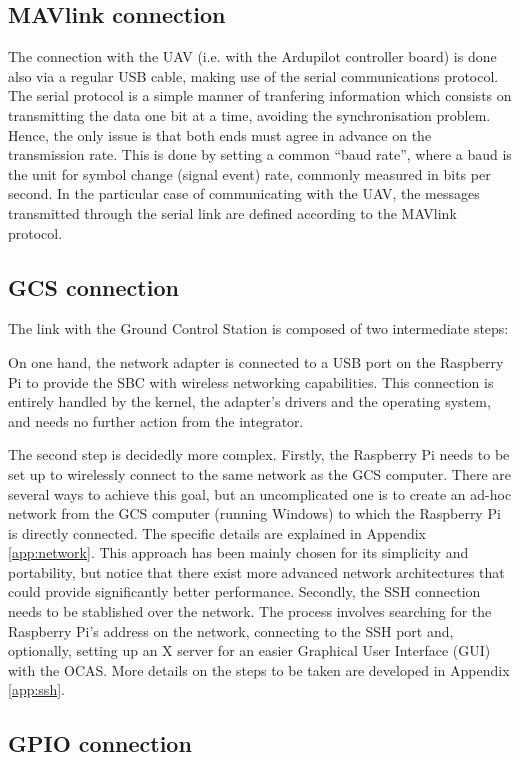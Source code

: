 \subsection{MAVlink connection}
The connection with the UAV (i.e. with the Ardupilot controller board) is done also via a regular USB cable, making use of the serial communications protocol.
The serial protocol is a simple manner of tranfering information which consists on transmitting the data one bit at a time, avoiding the synchronisation problem.
Hence, the only issue is that both ends must agree in advance on the transmission rate.
This is done by setting a common ``baud rate'', where a baud is the unit for symbol change (signal event) rate, commonly measured in bits per second.
In the particular case of communicating with the UAV, the messages transmitted through the serial link are defined according to the MAVlink protocol.

\subsection{GCS connection}
The link with the Ground Control Station is composed of two intermediate steps:

On one hand, the network adapter is connected to a USB port on the Raspberry Pi to provide the SBC with wireless networking capabilities.
This connection is entirely handled by the kernel, the adapter's drivers and the operating system, and needs no further action from the integrator.

The second step is decidedly more complex.
Firstly, the Raspberry Pi needs to be set up to wirelessly connect to the same network as the GCS computer.
There are several ways to achieve this goal, but an uncomplicated one is to create an ad-hoc network from the GCS computer (running Windows) to which the Raspberry Pi is directly connected.
The specific details are explained in Appendix \ref{app:network}.
This approach has been mainly chosen for its simplicity and portability, but notice that there exist more advanced network architectures that could provide significantly better performance.
Secondly, the SSH connection needs to be stablished over the network.
The process involves searching for the Raspberry Pi's address on the network, connecting to the SSH port and, optionally, setting up an X server for an easier Graphical User Interface (GUI) with the OCAS.
More details on the steps to be taken are developed in Appendix \ref{app:ssh}.

\subsection{GPIO connection}

